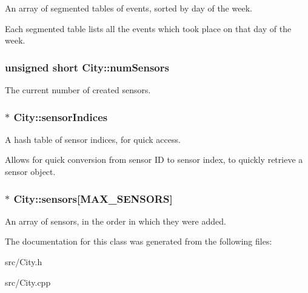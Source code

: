 An array of segmented tables of events, sorted by day of the week. 

Each segmented table lists all the events which took place on that day of the week. \hypertarget{class_city_a2b51b4ba827af8b46f9f3842e7c5c712}{}
\subsubsection[{num\+Sensors}]{\setlength{\rightskip}{0pt plus 5cm}unsigned short City\+::num\+Sensors\hspace{0.3cm}{\ttfamily [protected]}}\label{class_city_a2b51b4ba827af8b46f9f3842e7c5c712}


The current number of created sensors. 

\hypertarget{class_city_a3a22ef53bdf112feb314774d98e9e4c8}{}
\subsubsection[{sensor\+Indices}]{$\ast$ City\+::sensor\+Indices\hspace{0.3cm}{\ttfamily [protected]}}\label{class_city_a3a22ef53bdf112feb314774d98e9e4c8}


A hash table of sensor indices, for quick access. 

Allows for quick conversion from sensor I\+D to sensor index, to quickly retrieve a sensor object. \hypertarget{class_city_a195bcbb3cf70fa5f5d1ac8844e8e1b1c}{}
\subsubsection[{sensors}]{$\ast$ City\+::sensors\mbox{[}{\bf M\+A\+X\+\_\+\+S\+E\+N\+S\+O\+R\+S}\mbox{]}\hspace{0.3cm}{\ttfamily [protected]}}\label{class_city_a195bcbb3cf70fa5f5d1ac8844e8e1b1c}


An array of sensors, in the order in which they were added. 



The documentation for this class was generated from the following files\+:\begin{DoxyCompactItemize}
\item 
src/City.\+h\item 
src/City.\+cpp\end{DoxyCompactItemize}
